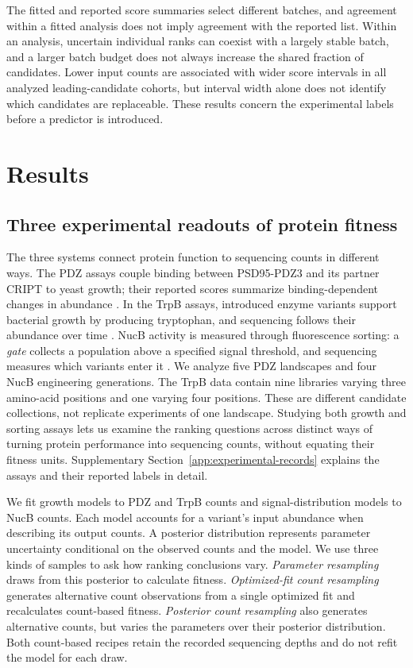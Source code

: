 \documentclass[11pt]{article}
\begin{document}
The fitted and reported score summaries select different batches, and
agreement within a fitted analysis does not imply agreement with the
reported list. Within an analysis, uncertain individual ranks can coexist
with a largely stable batch, and a larger batch budget does not always
increase the shared fraction of candidates. Lower input counts are
associated with wider score intervals in all analyzed leading-candidate
cohorts, but interval width alone does not identify which candidates are
replaceable. These results concern the experimental labels before a
predictor is introduced.

\section{Results}
\label{sec:results}

\subsection{Three experimental readouts of protein fitness}
\label{sec:overview}

The three systems connect protein function to sequencing counts in
different ways. The PDZ assays couple binding between PSD95-PDZ3 and
its partner CRIPT to yeast growth; their reported scores summarize
binding-dependent changes in abundance \citep{zarin2024}. In the TrpB
assays, introduced enzyme variants support bacterial growth by producing
tryptophan, and sequencing follows their abundance over time
\citep{johnston2024}. NucB activity is measured through fluorescence
sorting: a \emph{gate} collects a population above a specified signal
threshold, and sequencing measures which variants enter it
\citep{thomas2025}. We analyze five PDZ landscapes and four NucB
engineering generations. The TrpB data contain nine libraries varying
three amino-acid positions and one varying four positions.
These are different candidate collections, not replicate experiments of
one landscape. Studying both growth and sorting assays lets us examine
the ranking questions across distinct ways of turning protein performance
into sequencing counts, without equating their fitness units.
Supplementary Section~\ref{app:experimental-records}
explains the assays and their reported labels in detail.

We fit growth models to PDZ and TrpB counts and signal-distribution models
to NucB counts. Each model accounts for a variant's input abundance when
describing its output counts. A posterior distribution represents parameter
uncertainty conditional on the observed counts and the model.
We use three kinds of samples to ask how ranking conclusions vary.
\emph{Parameter resampling} draws from this posterior to calculate
fitness. \emph{Optimized-fit
count resampling} generates alternative count observations from a single
optimized fit and recalculates count-based fitness. \emph{Posterior count
resampling} also generates alternative counts, but varies the parameters
over their posterior distribution. Both count-based recipes retain the
recorded sequencing depths and do not
refit the model for each draw.
\end{document}
